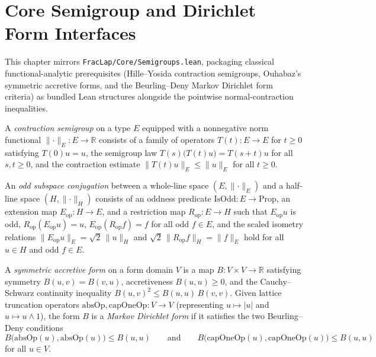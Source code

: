 \chapter{Core Semigroup and Dirichlet Form Interfaces}

This chapter mirrors \texttt{FracLap/Core/Semigroups.lean}, packaging classical functional-analytic prerequisites (Hille--Yosida contraction semigroups, Ouhabaz's symmetric accretive forms, and the Beurling--Deny Markov Dirichlet form criteria) as bundled Lean structures alongside the pointwise normal-contraction inequalities.

\begin{definition}\label{def:contraction_semigroup}
\leanok
A \emph{contraction semigroup} on a type $E$ equipped with a nonnegative norm functional $\lVert \cdot \rVert_E : E \to \mathbb{R}$ consists of a family of operators $T(t) : E \to E$ for $t \ge 0$ satisfying $T(0)u = u$, the semigroup law $T(s)\bigl(T(t)u\bigr) = T(s + t)u$ for all $s, t \ge 0$, and the contraction estimate $\lVert T(t)u \rVert_E \le \lVert u \rVert_E$ for all $t \ge 0$.
\end{definition}

\begin{definition}\label{def:odd_subspace_conjugation}
\leanok
An \emph{odd subspace conjugation} between a whole-line space $(E, \lVert \cdot \rVert_E)$ and a half-line space $(H, \lVert \cdot \rVert_H)$ consists of an oddness predicate $\mathrm{IsOdd} : E \to \mathrm{Prop}$, an extension map $E_{\mathrm{op}} : H \to E$, and a restriction map $R_{\mathrm{op}} : E \to H$ such that $E_{\mathrm{op}} u$ is odd, $R_{\mathrm{op}}(E_{\mathrm{op}} u) = u$, $E_{\mathrm{op}}(R_{\mathrm{op}} f) = f$ for all odd $f \in E$, and the scaled isometry relations $\lVert E_{\mathrm{op}} u \rVert_E = \sqrt{2}\, \lVert u \rVert_H$ and $\sqrt{2}\, \lVert R_{\mathrm{op}} f \rVert_H = \lVert f \rVert_E$ hold for all $u \in H$ and odd $f \in E$.
\end{definition}

\begin{definition}\label{def:symmetric_accretive_form}
\leanok
A \emph{symmetric accretive form} on a form domain $V$ is a map $B : V \times V \to \mathbb{R}$ satisfying symmetry $B(u, v) = B(v, u)$, accretiveness $B(u, u) \ge 0$, and the Cauchy--Schwarz continuity inequality $B(u, v)^2 \le B(u, u)\, B(v, v)$. Given lattice truncation operators $\mathrm{absOp}, \mathrm{capOneOp} : V \to V$ (representing $u \mapsto \lvert u \rvert$ and $u \mapsto u \wedge 1$), the form $B$ is a \emph{Markov Dirichlet form} if it satisfies the two Beurling--Deny conditions
\[
  B\bigl(\mathrm{absOp}(u), \mathrm{absOp}(u)\bigr) \le B(u, u)
  \qquad \text{and} \qquad
  B\bigl(\mathrm{capOneOp}(u), \mathrm{capOneOp}(u)\bigr) \le B(u, u)
\]
for all $u \in V$.
\end{definition}

